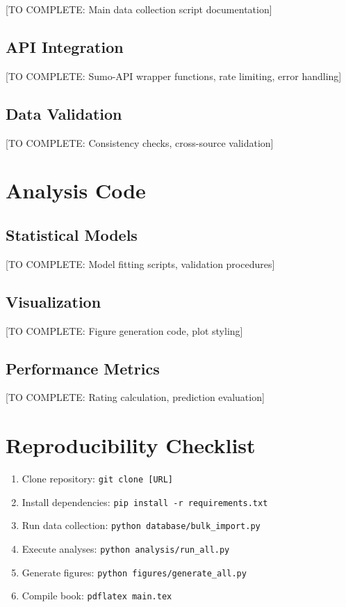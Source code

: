 [TO COMPLETE: Main data collection script documentation]

\subsection{API Integration}

[TO COMPLETE: Sumo-API wrapper functions, rate limiting, error handling]

\subsection{Data Validation}

[TO COMPLETE: Consistency checks, cross-source validation]

\section{Analysis Code}

\subsection{Statistical Models}

[TO COMPLETE: Model fitting scripts, validation procedures]

\subsection{Visualization}

[TO COMPLETE: Figure generation code, plot styling]

\subsection{Performance Metrics}

[TO COMPLETE: Rating calculation, prediction evaluation]

\section{Reproducibility Checklist}

\begin{enumerate}
\item Clone repository: \texttt{git clone [URL]}
\item Install dependencies: \texttt{pip install -r requirements.txt}
\item Run data collection: \texttt{python database/bulk\_import.py}
\item Execute analyses: \texttt{python analysis/run\_all.py}
\item Generate figures: \texttt{python figures/generate\_all.py}
\item Compile book: \texttt{pdflatex main.tex}
\end{enumerate}

